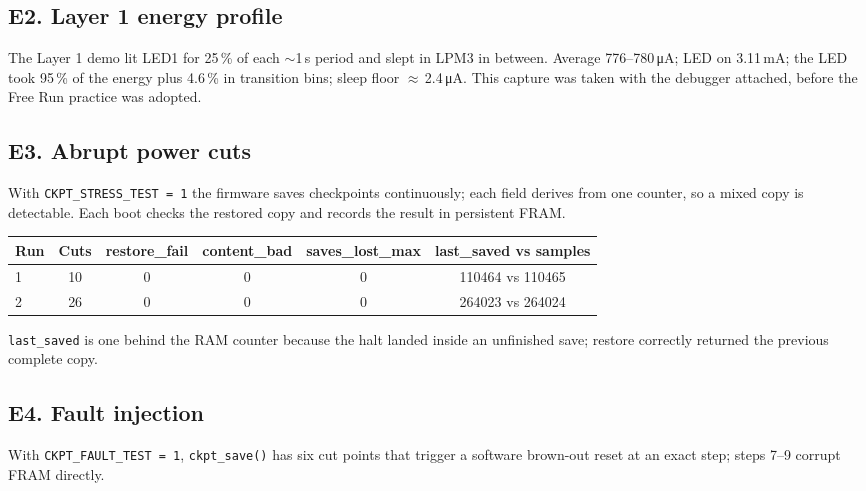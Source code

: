 \documentclass[conference]{IEEEtran}
\newcommand{\uA}{\,\si{\micro\ampere}}
\newcommand{\mA}{\,\si{\milli\ampere}}
\newcommand{\code}[1]{\texttt{#1}}
\begin{document}
\subsection*{E2. Layer 1 energy profile}
The Layer 1 demo lit LED1 for 25\,\% of each $\sim$1\,s period and slept in LPM3 in between. Average 776--780\uA; LED on 3.11\mA; the LED took 95\,\% of the energy plus 4.6\,\% in transition bins; sleep floor $\approx$\,2.4\uA. This capture was taken with the debugger attached, before the Free Run practice was adopted.

\subsection*{E3. Abrupt power cuts}
With \code{CKPT\_STRESS\_TEST = 1} the firmware saves checkpoints continuously; each field derives from one counter, so a mixed copy is detectable. Each boot checks the restored copy and records the result in persistent FRAM.

\begin{table}[H]
\centering\small
\begin{tabular}{@{}lccccc@{}}
\toprule
Run & Cuts & restore\_fail & content\_bad & saves\_lost\_max & last\_saved vs samples \\
\midrule
1 & 10 & 0 & 0 & 0 & 110464 vs 110465 \\
2 & 26 & 0 & 0 & 0 & 264023 vs 264024 \\
\bottomrule
\end{tabular}
\end{table}
\noindent \code{last\_saved} is one behind the RAM counter because the halt landed inside an unfinished save; restore correctly returned the previous complete copy.

\subsection*{E4. Fault injection}
With \code{CKPT\_FAULT\_TEST = 1}, \code{ckpt\_save()} has six cut points that trigger a software brown-out reset at an exact step; steps 7--9 corrupt FRAM directly.
\end{document}

